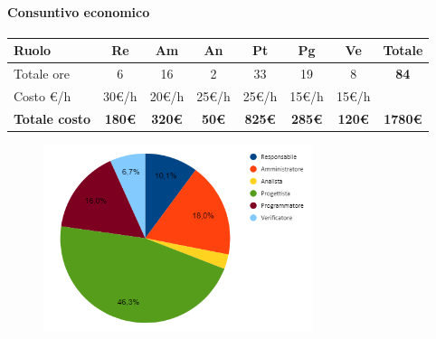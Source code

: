 \paragraph{Consuntivo economico}
\begin{center}
	\renewcommand{\arraystretch}{1.8}
	\begin{tabular}{ |m{6em}|c|c|c|c|c|c|c| }
	\hline
	\textbf{Ruolo} & \textbf{Re} & \textbf{Am} &  \textbf{An} &  \textbf{Pt} &  \textbf{Pg} &  \textbf{Ve} &  \textbf{Totale}\\
    \hline
    Totale ore & 6 & 16 & 2 & 33 & 19 & 8 & \textbf{84}\\
    \hline
    Costo \euro/h & 30\euro/h & 20\euro/h & 25\euro/h & 25\euro/h & 15\euro/h & 15\euro/h & \\
    \hline
    \textbf{Totale costo} & \textbf{180\euro} & \textbf{320\euro} &  \textbf{50\euro} &  \textbf{825\euro} &  \textbf{285\euro} &  \textbf{120\euro} &  \textbf{1780\euro}\\
    \hline
	\end{tabular}
    \begin{figure}[H]
        \centering\includegraphics[width=0.7\textwidth, height=0.7\textheight, keepaspectratio]{images/consuntivo/RTB-tecnologico-costo.png}
    \end{figure}
\end{center}

